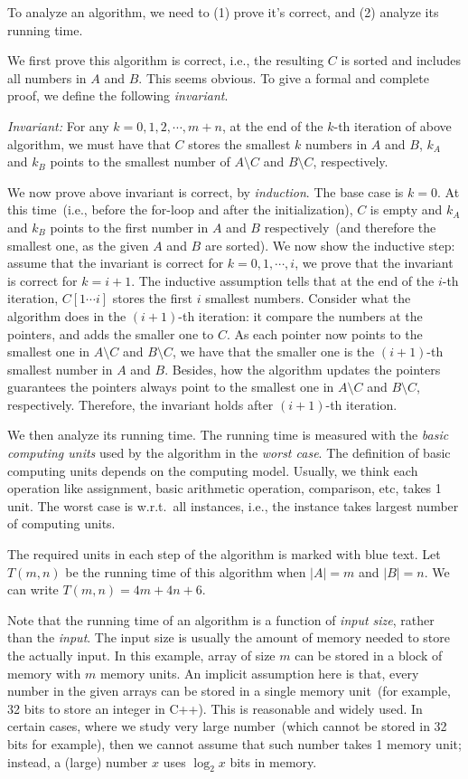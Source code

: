 To analyze an algorithm, we need to (1) prove it's correct, and (2) analyze its running time.

We first prove this algorithm is correct, i.e., the resulting $C$ is sorted and includes all numbers in $A$ and $B$.
This seems obvious. To give a formal and complete proof, we define the following \emph{invariant}. 

\emph{Invariant:} For any $k = 0, 1, 2, \cdots, m + n$,
at the end of the $k$-th iteration of above algorithm, we must have that $C$ stores the smallest $k$ numbers in $A$ and $B$, $k_A$ and $k_B$
points to the smallest number of $A\setminus C$ and $B\setminus C$, respectively. 

We now prove above invariant is correct, by \emph{induction}. The base case is $k = 0$. At this time~(i.e., before the for-loop and after the initialization), $C$ is empty and $k_A$ and $k_B$ points
to the first number in $A$ and $B$ respectively~(and therefore the smallest one, as the given $A$ and $B$ are sorted). We now show the inductive step:
assume that the invariant is correct for $k = 0, 1, \cdots, i$, we prove that the invariant is correct for $k = i + 1$.
The inductive assumption tells that at the end of the $i$-th iteration, $C[1\cdots i]$ stores the first $i$ smallest numbers.
Consider what the algorithm does in the $(i+1)$-th iteration: it compare the numbers at the pointers, and adds the smaller one to $C$.
As each pointer now points to the smallest one in $A\setminus C$ and $B\setminus C$, we have that the smaller one is the $(i+1)$-th smallest number 
in $A$ and $B$. Besides, how the algorithm updates the pointers guarantees the pointers always point to the smallest one
in $A\setminus C$ and $B\setminus C$, respectively. Therefore, the invariant holds after $(i + 1)$-th iteration.

We then analyze its running time.
The running time is measured with the \emph{basic computing units} used by the algorithm in the \emph{worst case}.
The definition of basic computing units depends on the computing model. Usually, we think each operation like assignment, basic arithmetic operation, comparison, etc,
takes 1 unit. The worst case is w.r.t.\ all instances, i.e., the instance takes largest number of computing units.

The required units in each step of the algorithm is marked with blue text. 
Let $T(m,n)$ be the running time of this algorithm when $|A| = m$ and $|B| = n$.
We can write $T(m,n) = 4m + 4n + 6$.  

Note that the running time of an algorithm is a function of \emph{input size}, rather than the \emph{input}.
The input size is usually the amount of memory needed to store the actually input.
In this example, array of size $m$ can be stored in a block of memory with $m$ memory units.
An implicit assumption here is that, every number in the given arrays can be
stored in a single memory unit~(for example, 32 bits to store an integer in C++).
This is reasonable and widely used. In certain cases, where we study very large number~(which cannot be stored in 32 bits for example),
then we cannot assume that such number takes 1 memory unit; instead, a (large) number $x$ uses $\log_2 x$ bits in memory.

